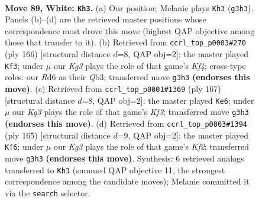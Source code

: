 \documentclass[11pt]{article}
\begin{document}
\clearpage

\begin{figure}[p]\centering
\begin{subfigure}{0.46\textwidth}\centering
\resizebox{\linewidth}{!}{%
\newchessgame
\chessboard[
  setfen={5rk1/P7/3R4/8/8/6K1/8/8 w - - 47 89},
  showmover=false,
  pgfstyle=straightmove, color=movearrow, markmove={g3-h3}
]}
\caption{}
\end{subfigure}\hfill
\begin{subfigure}{0.46\textwidth}\centering
\resizebox{\linewidth}{!}{%
\newchessgame
\chessboard[
  setfen={8/8/8/8/5K2/1Q6/3kr3/8 w - - 25 84},
  showmover=false,
  pgfstyle=straightmove, color=movearrow, markmove={f4-f3}
]}
\caption{}
\end{subfigure}
\\[4pt]
\begin{subfigure}{0.46\textwidth}\centering
\resizebox{\linewidth}{!}{%
\newchessgame
\chessboard[
  setfen={8/8/5k2/R7/K7/8/8/8 b - - 1 84},
  showmover=false,
  pgfstyle=straightmove, color=movearrow, markmove={f6-e6}
]}
\caption{}
\end{subfigure}\hfill
\begin{subfigure}{0.46\textwidth}\centering
\resizebox{\linewidth}{!}{%
\newchessgame
\chessboard[
  setfen={8/5k2/8/3KR3/8/8/8/8 b - - 6 83},
  showmover=false,
  pgfstyle=straightmove, color=movearrow, markmove={f7-f6}
]}
\caption{}
\end{subfigure}
\caption{\textbf{Move 89, White: \texttt{Kh3}.} (a) Our position; Melanie plays \texttt{Kh3} (\texttt{g3h3}). Panels (b)--(d) are the retrieved master positions whose correspondence most drove this move (highest QAP objective among those that transfer to it). (b) Retrieved from \texttt{ccrl\_top\_p0003\#270} (ply 166) [structural distance $d$=8, QAP obj=2]: the master played \texttt{Kf3}; under $\mu$ our \emph{Kg3} plays the role of that game's \emph{Kf4}; cross-type roles: our \emph{R}d6 as their \emph{Q}b3; transferred move \texttt{g3h3} \textbf{(endorses this move)}. (c) Retrieved from \texttt{ccrl\_top\_p0001\#1369} (ply 167) [structural distance $d$=8, QAP obj=2]: the master played \texttt{Ke6}; under $\mu$ our \emph{Kg3} plays the role of that game's \emph{Kf3}; transferred move \texttt{g3h3} \textbf{(endorses this move)}. (d) Retrieved from \texttt{ccrl\_top\_p0003\#1394} (ply 165) [structural distance $d$=9, QAP obj=2]: the master played \texttt{Kf6}; under $\mu$ our \emph{Kg3} plays the role of that game's \emph{Kf2}; transferred move \texttt{g3h3} \textbf{(endorses this move)}. Synthesis: 6 retrieved analogs transferred to \texttt{Kh3} (summed QAP objective 11, the strongest correspondence among the candidate moves); Melanie committed it via the \texttt{search} selector.}
\label{fig:thought-m176}
\end{figure}
\end{document}
